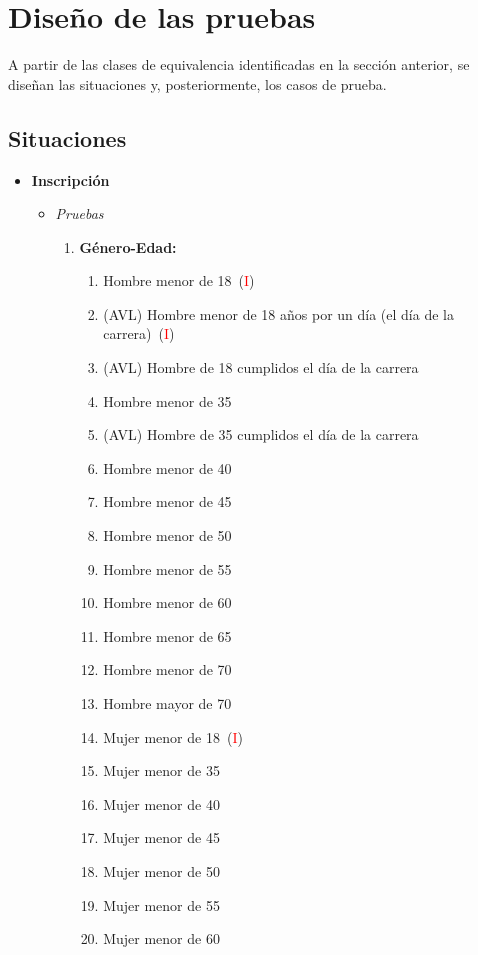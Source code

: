 \chapter{Diseño de las pruebas}
A partir de las clases de equivalencia identificadas en la sección anterior,
se diseñan las situaciones y, posteriormente, los casos de prueba.

\section{Situaciones}
\begin{itemize}
	\item \textbf{Inscripción}
		\begin{itemize}
			\item \textit{Pruebas}
				\begin{enumerate}[label*=SPI\arabic*.]
					\item \textbf{Género-Edad:} \begin{enumerate}[label*=\arabic*]
						\item Hombre menor de 18~(\textcolor{red}{I})
						\item (AVL) Hombre menor de 18 años por un día (el día de la carrera)~(\textcolor{red}{I})
						\item (AVL) Hombre de 18 cumplidos el día de la carrera
						\item Hombre menor de 35
						\item (AVL) Hombre de 35 cumplidos el día de la carrera
						\item Hombre menor de 40
						\item Hombre menor de 45
						\item Hombre menor de 50
						\item Hombre menor de 55
						\item Hombre menor de 60
						\item Hombre menor de 65
						\item Hombre menor de 70
						\item Hombre mayor de 70
						\item Mujer menor de 18~(\textcolor{red}{I})
						\item Mujer menor de 35
						\item Mujer menor de 40
						\item Mujer menor de 45
						\item Mujer menor de 50
						\item Mujer menor de 55
						\item Mujer menor de 60

\end{enumerate}
\end{enumerate}
\end{itemize}
\end{itemize}
